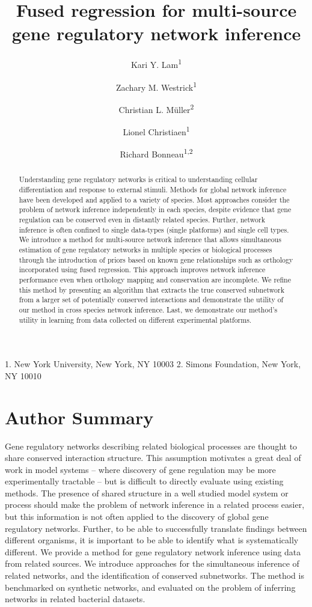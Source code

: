 \documentclass[11pt]{article}
\begin{document}
\title{Fused regression for multi-source gene regulatory network inference}
\author{Kari Y. Lam\textsuperscript{1} \and Zachary M. Westrick\textsuperscript{1} \and Christian L. M\"{u}ller\textsuperscript{2}\and Lionel Christiaen\textsuperscript{1} \and Richard Bonneau\textsuperscript{1,2}}
\maketitle

  1. New York University, New York, NY 10003
  2. Simons Foundation, New York, NY 10010


\begin{abstract}
Understanding gene regulatory networks is critical to understanding cellular differentiation and response to external stimuli. Methods for global network inference have been developed and applied to a variety of species. 
Most approaches consider the problem of network inference independently in each species, despite evidence that gene regulation can be conserved even in distantly related species. 
Further, network inference is often confined to single data-types (single platforms) and single cell types. 
We introduce a method for multi-source network inference that allows simultaneous estimation of gene regulatory networks in multiple species or biological processes through the introduction of priors based on known gene relationships such as orthology incorporated using fused regression. 
This approach improves network inference performance even when orthology mapping and conservation are incomplete. 
We refine this method by presenting an algorithm that extracts the true conserved subnetwork from a larger set of potentially conserved interactions and demonstrate the utility of our method in cross species network inference. 
Last, we demonstrate our method's utility in learning from data collected on different experimental platforms.
\end{abstract}

\section{Author Summary}

Gene regulatory networks describing related biological processes are thought to share conserved interaction structure. This assumption motivates a great deal of work in model systems – where discovery of gene regulation may be more experimentally tractable – but is difficult to directly evaluate using existing methods. The presence of shared structure in a well studied model system or process should make the problem of network inference in a related process easier, but this information is not often applied to the discovery of global gene regulatory networks. Further, to be able to successfully translate findings between different organisms, it is important to be able to identify what is systematically different. We provide a method for gene regulatory network inference using data from related sources. We introduce approaches for the simultaneous inference of related networks, and the identification of conserved subnetworks. The method is benchmarked on synthetic networks, and evaluated on the problem of inferring networks in related bacterial datasets.
\end{document}
